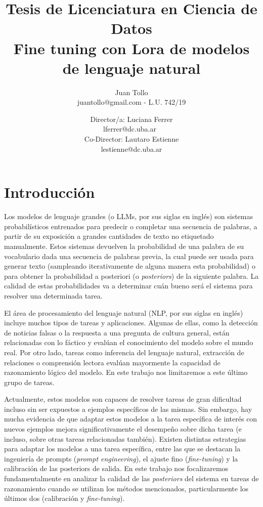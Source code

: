 \documentclass[a4paper,11pt,titlepage]{article}
\title{Tesis de Licenciatura en Ciencia de Datos{\Huge \\ Fine tuning  con Lora de modelos de lenguaje natural} }
\author{Juan Tollo\\{\small juantollo@gmail.com - L.U. 742/19}}
\date{Director/a: Luciana Ferrer \\{\small lferrer@dc.uba.ar}~\vspace{0.2cm}\\ Co-Director: Lautaro Estienne \\{\small lestienne@dc.uba.ar}}
\begin{document}
 
 \maketitle

 
\section{Introducción}
Los modelos de lenguaje grandes (o LLMs, por sus siglas en inglés) son sistemas probabilísticos entrenados para predecir o completar una secuencia de palabras, a partir de su exposición a grandes cantidades de texto no etiquetado manualmente. Estos sistemas devuelven la probabilidad de una palabra de su vocabulario dada una secuencia de palabras previa, la cual puede ser usada para generar texto (sampleando iterativamente de alguna manera esta probabilidad) o para obtener la probabilidad a posteriori (o \emph{posteriors}) de la siguiente palabra. La calidad de estas probabilidades va a determinar cuán bueno será el sistema para resolver una determinada tarea.

El área de procesamiento del lenguaje natural (NLP, por sus siglas en inglés) incluye muchos tipos de tareas y aplicaciones. Algunas de ellas, como la detección de noticias falsas o la respuesta a una pregunta de cultura general, están relacionadas con lo fáctico y evalúan el conocimiento  del modelo sobre el mundo real. Por otro lado, tareas como inferencia del lenguaje natural, extracción de relaciones o comprensión lectora evalúan mayormente la capacidad de razonamiento lógico del modelo. En este trabajo nos limitaremos a este último grupo de tareas.

Actualmente, estos modelos son capaces de resolver tareas de gran dificultad incluso sin ser expuestos a ejemplos específicos de las mismas. Sin embargo, hay mucha evidencia de que adaptar estos modelos a la tarea específica de interés con nuevos ejemplos mejora significativamente el desempeño sobre dicha tarea (e incluso, sobre otras tareas relacionadas también). Existen distintas estrategias para adaptar los modelos a una tarea específica, entre las que se destacan la ingeniería de prompts (\textit{prompt engineering}), el ajuste fino (\textit{fine-tuning}) y la calibración de las posteriors de salida. En este trabajo nos focalizaremos fundamentalmente en analizar la calidad de las \emph{posteriors} del sistema en tareas de razonamiento cuando se utilizan los métodos mencionados, particularmente los últimos dos (calibración y \textit{fine-tuning}).
\end{document}
